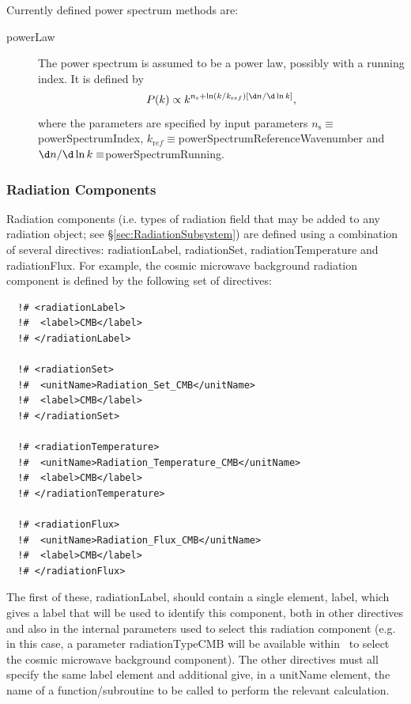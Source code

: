 Currently defined power spectrum methods are:
\begin{description}
 \item [{\normalfont \ttfamily powerLaw}] The power spectrum is assumed to be a power law, possibly with a running index. It is defined by
\begin{equation}
 P(k)\propto k^{n_{\mathrm s} + \ln(k/k_{\mathrm ref}) [\d n /\d\ln k]},
\end{equation}
where the parameters are specified by input parameters $n_{\mathrm s}\equiv${\normalfont \ttfamily powerSpectrumIndex}, $k_{\mathrm ref}\equiv${\normalfont \ttfamily powerSpectrumReferenceWavenumber} and $\d n / \d \ln k \equiv${\normalfont \ttfamily powerSpectrumRunning}.
\end{description}

\subsubsection{Radiation Components}\label{sec:radiationComponents}

Radiation components (i.e. types of radiation field that may be added to any radiation object; see \S\ref{sec:RadiationSubsystem}) are defined using a combination of several directives: {\normalfont \ttfamily radiationLabel}, {\normalfont \ttfamily radiationSet}, {\normalfont \ttfamily radiationTemperature} and {\normalfont \ttfamily radiationFlux}. For example, the cosmic microwave background radiation component is defined by the following set of directives:
\begin{verbatim}
  !# <radiationLabel>
  !#  <label>CMB</label>
  !# </radiationLabel>

  !# <radiationSet>
  !#  <unitName>Radiation_Set_CMB</unitName>
  !#  <label>CMB</label>
  !# </radiationSet>

  !# <radiationTemperature>
  !#  <unitName>Radiation_Temperature_CMB</unitName>
  !#  <label>CMB</label>
  !# </radiationTemperature>

  !# <radiationFlux>
  !#  <unitName>Radiation_Flux_CMB</unitName>
  !#  <label>CMB</label>
  !# </radiationFlux>
\end{verbatim}
The first of these, {\normalfont \ttfamily radiationLabel}, should contain a single element, {\normalfont \ttfamily label}, which gives a label that will be used to identify this component, both in other directives and also in the internal parameters used to select this radiation component (e.g. in this case, a parameter {\normalfont \ttfamily radiationTypeCMB} will be available within \glc\ to select the cosmic microwave background component). The other directives must all specify the same {\normalfont \ttfamily label} element and additional give, in a {\normalfont \ttfamily unitName} element, the name of a function/subroutine to be called to perform the relevant calculation.

